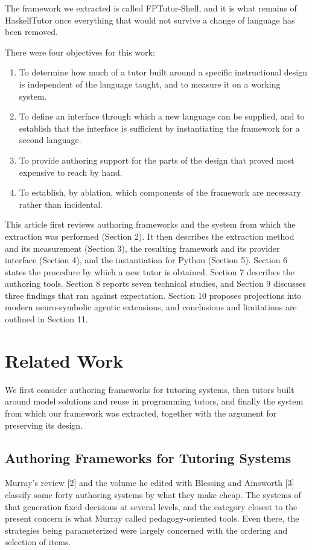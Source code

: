 \documentclass[10pt,twocolumn,letterpaper]{article}
\providecommand{\tightlist}{\setlength{\itemsep}{0pt}\setlength{\parskip}{0pt}}
\begin{document}
The framework we extracted is called FPTutor-Shell, and it is what
remains of HaskellTutor once everything that would not survive a change
of language has been removed.

There were four objectives for this work:
\begin{enumerate}
\def\labelenumi{\arabic{enumi}.}
\tightlist
\item
  To determine how much of a tutor built around a specific instructional
  design is independent of the language taught, and to measure it on a
  working system.
\item
  To define an interface through which a new language can be supplied,
  and to establish that the interface is sufficient by instantiating the
  framework for a second language.
\item
  To provide authoring support for the parts of the design that proved
  most expensive to reach by hand.
\item
  To establish, by ablation, which components of the framework are
  necessary rather than incidental.
\end{enumerate}

This article first reviews authoring frameworks and the system from
which the extraction was performed (Section 2). It then describes the
extraction method and its measurement (Section 3), the resulting
framework and its provider interface (Section 4), and the instantiation
for Python (Section 5). Section 6 states the procedure by which a new
tutor is obtained. Section 7 describes the authoring tools. Section 8
reports seven technical studies, and Section 9 discusses three findings
that ran against expectation. Section 10 proposes projections into modern neuro-symbolic agentic extensions, and conclusions and limitations are outlined in Section 11.

\section{Related Work}
We first consider authoring frameworks for tutoring systems, then tutors
built around model solutions and reuse in programming tutors, and finally
the system from which our framework was extracted, together with the
argument for preserving its design.

\subsection{Authoring Frameworks for Tutoring Systems}
Murray's review [2] and the volume he edited with Blessing and
Ainsworth [3] classify some forty authoring systems by what they
make cheap. The systems of that generation fixed decisions at several
levels, and the category closest to the present concern is what Murray
called pedagogy-oriented tools. Even there, the strategies being
parameterized were largely concerned with the ordering and selection of
items.
\end{document}
